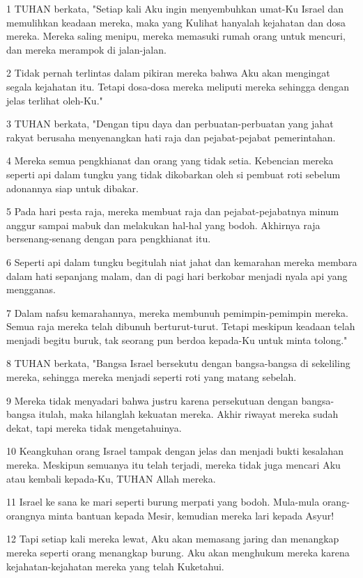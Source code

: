 \par 1 TUHAN berkata, "Setiap kali Aku ingin menyembuhkan umat-Ku Israel dan memulihkan keadaan mereka, maka yang Kulihat hanyalah kejahatan dan dosa mereka. Mereka saling menipu, mereka memasuki rumah orang untuk mencuri, dan mereka merampok di jalan-jalan.
\par 2 Tidak pernah terlintas dalam pikiran mereka bahwa Aku akan mengingat segala kejahatan itu. Tetapi dosa-dosa mereka meliputi mereka sehingga dengan jelas terlihat oleh-Ku."
\par 3 TUHAN berkata, "Dengan tipu daya dan perbuatan-perbuatan yang jahat rakyat berusaha menyenangkan hati raja dan pejabat-pejabat pemerintahan.
\par 4 Mereka semua pengkhianat dan orang yang tidak setia. Kebencian mereka seperti api dalam tungku yang tidak dikobarkan oleh si pembuat roti sebelum adonannya siap untuk dibakar.
\par 5 Pada hari pesta raja, mereka membuat raja dan pejabat-pejabatnya minum anggur sampai mabuk dan melakukan hal-hal yang bodoh. Akhirnya raja bersenang-senang dengan para pengkhianat itu.
\par 6 Seperti api dalam tungku begitulah niat jahat dan kemarahan mereka membara dalam hati sepanjang malam, dan di pagi hari berkobar menjadi nyala api yang mengganas.
\par 7 Dalam nafsu kemarahannya, mereka membunuh pemimpin-pemimpin mereka. Semua raja mereka telah dibunuh berturut-turut. Tetapi meskipun keadaan telah menjadi begitu buruk, tak seorang pun berdoa kepada-Ku untuk minta tolong."
\par 8 TUHAN berkata, "Bangsa Israel bersekutu dengan bangsa-bangsa di sekeliling mereka, sehingga mereka menjadi seperti roti yang matang sebelah.
\par 9 Mereka tidak menyadari bahwa justru karena persekutuan dengan bangsa-bangsa itulah, maka hilanglah kekuatan mereka. Akhir riwayat mereka sudah dekat, tapi mereka tidak mengetahuinya.
\par 10 Keangkuhan orang Israel tampak dengan jelas dan menjadi bukti kesalahan mereka. Meskipun semuanya itu telah terjadi, mereka tidak juga mencari Aku atau kembali kepada-Ku, TUHAN Allah mereka.
\par 11 Israel ke sana ke mari seperti burung merpati yang bodoh. Mula-mula orang-orangnya minta bantuan kepada Mesir, kemudian mereka lari kepada Asyur!
\par 12 Tapi setiap kali mereka lewat, Aku akan memasang jaring dan menangkap mereka seperti orang menangkap burung. Aku akan menghukum mereka karena kejahatan-kejahatan mereka yang telah Kuketahui.
